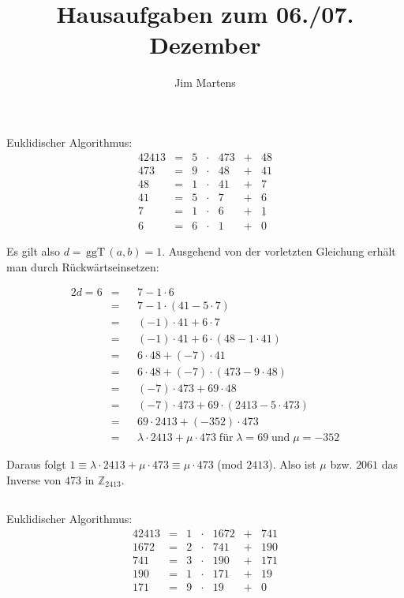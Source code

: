 \documentclass[10pt,a4paper,oneside,ngerman,numbers=noenddot]{scrartcl}
\begin{document}
\author{Jim Martens}
\title{Hausaufgaben zum 06./07. Dezember}
\maketitle
\section{} %
\subsection{} %
Euklidischer Algorithmus:\\
\begin{alignat*}{4}
2413 &=& 5 &\cdot & 473 &+& 48 \\
473 &=& 9 &\cdot & 48 &+& 41 \\
48 &=& 1 &\cdot & 41 &+& 7 \\
41 &=& 5 &\cdot & 7 &+& 6 \\
7 &=& 1 &\cdot & 6 &+& \underline{1} \\
6 &=& 6 &\cdot & 1 &+& 0
\end{alignat*}

Es gilt also $d = \,\text{ggT}\,(a,b) = 1$. Ausgehend von der vorletzten Gleichung erhält man durch Rückwärtseinsetzen:

\begin{alignat*}{2}
d = 6& = &&7 - 1 \cdot 6 \\
&=&& 7 - 1 \cdot (41 - 5 \cdot 7) \\
&=&& (-1) \cdot 41 + 6 \cdot 7  \\
&=&& (-1) \cdot 41 + 6 \cdot (48 - 1 \cdot 41) \\
&=&& 6 \cdot 48 + (-7) \cdot 41 \\
&=&& 6 \cdot 48 + (-7) \cdot (473 - 9 \cdot 48) \\
&=&& (-7) \cdot 473 + 69 \cdot 48 \\
&=&& (-7) \cdot 473 + 69 \cdot (2413 - 5 \cdot 473) \\
&=&& 69 \cdot 2413 + (-352) \cdot 473 \\
&=&& \lambda \cdot 2413 + \mu \cdot 473 \;\text{für} \; \lambda = 69 \;\text{und}\; \mu = -352
\end{alignat*}

Daraus folgt $1 \equiv \lambda \cdot 2413 + \mu \cdot 473 \equiv \mu \cdot 473$ (mod $2413$). Also ist $\mu$ bzw. $2061$ das Inverse von $473$ in $\mathbb{Z}_{2413}$.
\subsection{} %
Euklidischer Algorithmus:\\
\begin{alignat*}{4}
2413 &=& 1 &\cdot & 1672 &+& 741 \\
1672 &=& 2 &\cdot & 741 &+& 190 \\
741 &=& 3 &\cdot & 190 &+& 171 \\
190 &=& 1 &\cdot & 171 &+& 19 \\
171 &=& 9 &\cdot & 19 &+& 0
\end{alignat*}
\end{document}
